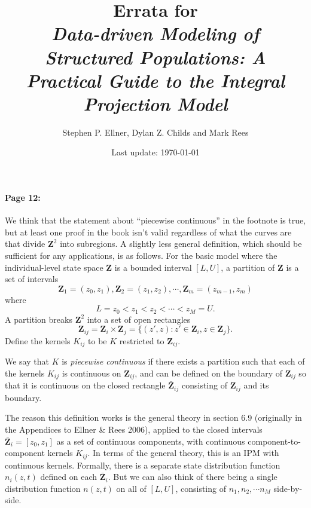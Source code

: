 \documentclass[12pt]{article}
\numberwithin{Box}{section}
\def\Z{\mathbf{Z}}
\newcommand{\be}{\begin{equation}}
\newcommand{\ee}{\end{equation}}
\begin{document}
\author{Stephen P. Ellner, Dylan Z. Childs and Mark Rees}
\title{Errata for \\ \emph{Data-driven Modeling of Structured Populations: 
A Practical Guide to the Integral Projection Model}} 

\date{Last update: \today} 

\maketitle

\paragraph{Page 12:} We think that the statement about ``piecewise continuous'' in the footnote is true, 
but at least one proof in the book isn't valid regardless of what the curves are that divide $\Z^2$ into 
subregions. A slightly less general definition, which should be sufficient for any applications, is as follows. 
For the basic model where the individual-level state space $\Z$ is a 
bounded interval $[L,U]$, a partition of $\Z$ is a set of 
intervals 
\begin{equation}
\Z_1 = (z_0,z_1), \Z_2 = (z_1,z_2), \cdots, \Z_m = (z_{m-1},z_m) 
\end{equation}
where 
\be
L=z_0 < z_1 < z_2 < \cdots < z_M=U. 
\ee
A partition breaks $\Z^2$ into a set of open rectangles 
$$\Z_{ij} = \Z_i \times \Z_j = \{(z',z): z' \in \Z_i, z \in \Z_j\}.$$
Define the kernels $K_{ij}$ to be $K$ restricted to $\Z_{ij}$. 

We say that $K$ is \emph{piecewise continuous} if there exists a 
partition such that each of the kernels $K_{ij}$ is continuous on $\Z_{ij}$, 
and can be defined on the boundary of $\Z_{ij}$ so that it is continuous
on the closed rectangle $\bar{\Z}_{ij}$ consisting of $\Z_{ij}$ and its boundary.  

The reason this definition works is the general theory in section 6.9
(originally in the Appendices to Ellner \& Rees 2006), applied to the  
closed intervals $\bar{\Z}_{i} =  [z_0,z_1]$ as a set of continuous components, 
with continuous component-to-component kernels $K_{ij}$. In terms of the general     
theory, this is an IPM with continuous kernels. Formally, there is a separate state distribution 
function $n_i(z,t)$ defined on each $\bar{\Z}_i$. But we can also think of there being a 
single distribution function $n(z,t)$ on all of $[L,U]$, consisting of $n_1,n_2, \cdots n_M$ 
side-by-side. 
\end{document}
